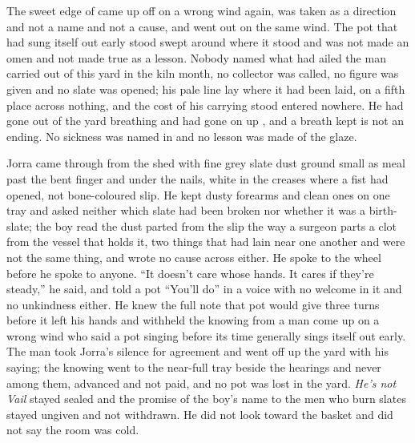 The sweet edge of  came up off  on a wrong wind again, was taken as a direction and not a name and not a cause, and went out on the same wind. The pot that had sung itself out early stood swept around where it stood and was not made an omen and not made true as a lesson. Nobody named what had ailed the man carried out of this yard in the kiln month, no collector was called, no figure was given and no slate was opened; his pale line lay where it had been laid, on a fifth place across nothing, and the cost of his carrying stood entered nowhere. He had gone out of the yard breathing and had gone on up , and a breath kept is not an ending. No sickness was named in  and no lesson was made of the glaze.

\scenebreak

Jorra came through from the shed with fine grey slate dust ground small as meal past the bent finger and under the nails, white in the creases where a fist had opened, not bone-coloured slip. He kept dusty forearms and clean ones on one tray and asked neither which slate had been broken nor whether it was a birth-slate; the boy read the dust parted from the slip the way a surgeon parts a clot from the vessel that holds it, two things that had lain near one another and were not the same thing, and wrote no cause across either. He spoke to the wheel before he spoke to anyone. “It doesn't care whose hands. It cares if they're steady,” he said, and told a pot “You'll do” in a voice with no welcome in it and no unkindness either. He knew the full note that pot would give three turns before it left his hands and withheld the knowing from a man come up on a wrong wind who said a pot singing before its time generally sings itself out early. The man took Jorra's silence for agreement and went off up the yard with his saying; the knowing went to the near-full tray beside the hearings and never among them, advanced and not paid, and no pot was lost in the yard. \emph{He's not Vail} stayed sealed and the promise of the boy's name to the men who burn slates stayed ungiven and not withdrawn. He did not look toward the basket and did not say the room was cold.

